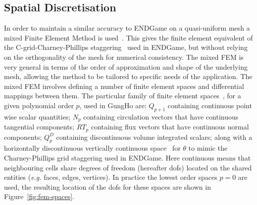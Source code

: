 \documentclass[review,times]{elsarticle}
\begin{document}
\subsection{Spatial Discretisation\label{sec:sub:spatial}}

In order to maintain a similar
accuracy to ENDGame on a quasi-uniform mesh a mixed Finite Element Method is 
used~\citep{cotter2012, natale2016}. This gives the finite element equivalent 
of the C-grid-Charney-Phillips staggering~\citep{charney1953numerical, arakawa1977computational}
used in ENDGame, but without relying
on the orthogonality of the mesh for numerical consistency. The mixed FEM
is very general in terms of the order of approximation and shape of the 
underlying mesh, allowing the method to be tailored to specific needs of the 
application. The mixed FEM involves defining a number of finite 
element spaces and differential mappings between them. The particular family of 
finite element spaces~\citep{boffi2013}, for a given polynomial order $p$, used 
in GungHo are: $Q_{p+1}$ containing continuous 
point wise scalar quantities; $N_p$ containing circulation vectors that have
continuous tangential components; $RT_p$ containing flux vectors that have 
continuous normal components; $Q_p^D$ containing discontinuous volume 
integrated scalars; along with a horizontally discontinuous vertically continuous 
space~\citep{natale2016} for $\theta$ to mimic the Charney-Phillips grid staggering 
used in ENDGame. Here continuous means that neighbouring cells share degrees of freedom 
(hereafter dofs) located on the shared entities ({\em e.g.} faces, edges, vertices).
In practice the lowest order spaces $p=0$ are used, the resulting location of the dofs
for these spaces are shown in Figure~\ref{fig:fem-spaces}. 
\end{document}
